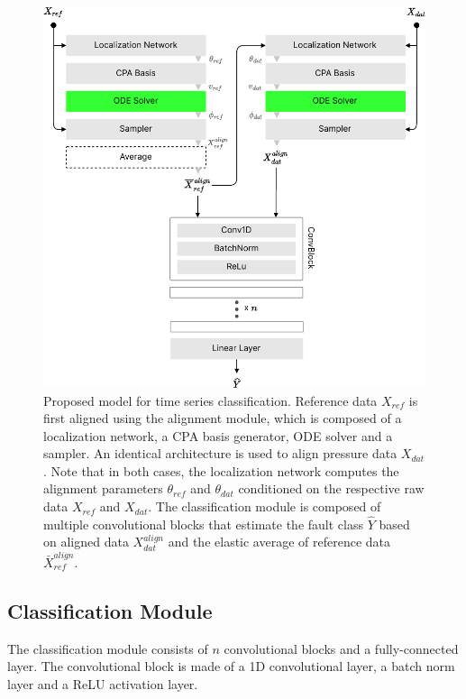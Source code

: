 \begin{figure}[!htb]
    \begin{center}
    \includegraphics[width=\linewidth]{figures/phm3.pdf}
    \caption{Proposed model for time series classification. Reference data $X_{ref}$ is first aligned using the alignment module, which is composed of a localization network, a CPA basis generator, ODE solver and a sampler. An identical architecture is used to align pressure data $X_{dat}$. Note that in both cases, the localization network computes the alignment parameters $\theta_{ref}$ and $\theta_{dat}$ conditioned on the respective raw data $X_{ref}$ and $X_{dat}$. The classification module is composed of multiple convolutional blocks that estimate the fault class $\hat{Y}$ based on aligned data $X_{dat}^{align}$ and the elastic average of reference data $\bar{X}_{ref}^{align}$.}
    \label{fig:phm_method1}
    \end{center}
\end{figure}

\clearpage
\subsection{Classification Module}
The classification module consists of $n$ convolutional blocks and a fully-connected layer. The convolutional block is made of a 1D convolutional layer, a batch norm layer and a ReLU activation layer. 

